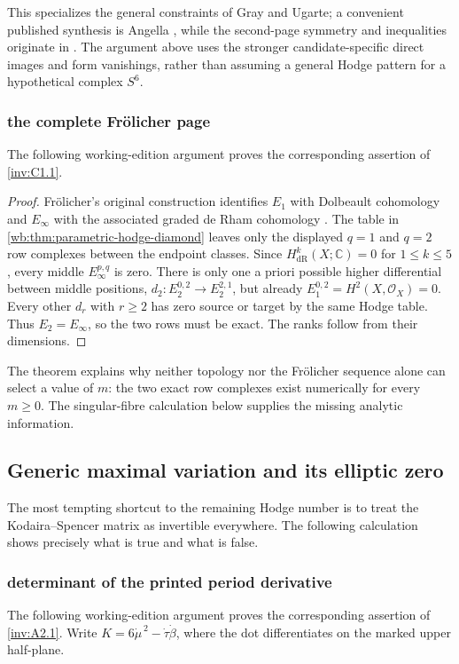 This specializes the general constraints of Gray and Ugarte; a convenient
published synthesis is Angella \cite{Angella2018}, while the second-page
symmetry and inequalities originate in \cite{Ugarte2000}.  The argument
above uses the stronger candidate-specific direct images and form
vanishings, rather than assuming a general Hodge pattern for a hypothetical
complex $S^6$.

\subsubsection{the complete Fr\"olicher page}\label{inv:wbproof:thm:frolicher-e2-candidate}
The following working-edition argument proves the corresponding assertion of \cref{inv:C1.1}.


\begin{proof}
Fr\"olicher's original construction identifies $E_1$ with Dolbeault
cohomology and $E_\infty$ with the associated graded de Rham cohomology
\cite[p.~643, Lemmas~1--2 and Theorem~3]{Frolicher1955}.  The table in
\cref{wb:thm:parametric-hodge-diamond} leaves only the displayed
$q=1$ and $q=2$ row complexes between the endpoint classes.  Since
$H^k_{\mathrm{dR}}(X;\mathbb C)=0$ for $1\le k\le5$, every middle
$E_\infty^{p,q}$ is zero.  There is only one a priori possible higher
differential between middle positions,
$d_2:E_2^{0,2}\to E_2^{2,1}$, but already
$E_1^{0,2}=H^2(X,\mathcal O_X)=0$.  Every other $d_r$ with $r\ge2$ has
zero source or target by the same Hodge table.  Thus $E_2=E_\infty$, so the
two rows must be exact.  The ranks follow from their dimensions.
\end{proof}

The theorem explains why neither topology nor the Fr\"olicher sequence alone
can select a value of $m$: the two exact row complexes exist numerically for
every $m\ge0$.  The singular-fibre calculation below supplies the missing
analytic information.

\subsection{Generic maximal variation and its elliptic zero}

The most tempting shortcut to the remaining Hodge number is to treat the
Kodaira--Spencer matrix as invertible everywhere.  The following calculation
shows precisely what is true and what is false.

\subsubsection{determinant of the printed period derivative}\label{inv:wbproof:prop:period-derivative-determinant}
The following working-edition argument proves the corresponding assertion of \cref{inv:A2.1}.
Write $K=6\dot\mu^{\,2}-\dot\tau\dot\beta$, where the dot differentiates on the marked upper half-plane.


